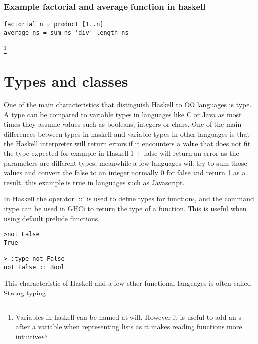 \documentclass[12pt, oneside]{article}
\begin{document}
\subsubsection{Example factorial and average function in haskell}
\begin{lstlisting}
factorial n = product [1..n]
average ns = sum ns 'div' length ns
\end{lstlisting}\footnote{Variables in haskell can be named at will. However it is useful to add an s after a variable when representing lists as it makes reading functions more intuitive}

\section{Types and classes}
One of the main characteristics that distinguish Haskell to OO languages is type. A type can be compared to variable types in languages like C or Java as most times they assume values such as booleans, integers or chars.
One of the main differences between types in haskell and variable types in other languages is that the Haskell interpreter will return errors if it encounters a value that does not fit the type expected for example in Haskell 1 + false will return an error as the parameters are different types, meanwhile a few languages will try to sum those values and convert the false to an integer normally 0 for false and return 1 as a result, this example is true in languages such as Javascript.

In Haskell the operator '::' is used to define types for functions, and the command :type can be used in GHCi to return the type of a function. This is useful when using default prelude functions.
\begin{lstlisting}
>not False
True

> :type not False
not False :: Bool
\end{lstlisting}
This characteristic of Haskell and a few other functional languages is often called Strong typing. 
\end{document}
